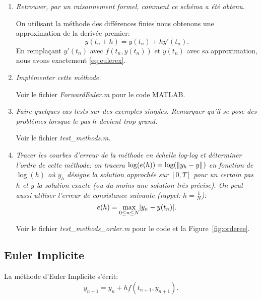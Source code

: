 \documentclass[a4paper,10pt]{article}
\begin{document}
\begin{enumerate}
    \item \emph{Retrouver, par un raisonnement formel, comment ce schéma a été
    obtenu.}

    On utilisant la méthode des différences finies nous obtenons une approximation de
    la derivée premier:
\[
    y(t_n + h) = y(t_n) + hy'(t_n).
\]
    En remplaçant $y'(t_n)$ avec $f(t_n, y(t_n))$ et $y(t_n)$ avec sa approximation,
    nous avons exactement \eqref{eq:eulerex}.

    \item \emph{Implémenter cette méthode.}

    Voir le fichier \emph{ForwardEuler.m} pour le code MATLAB.

    \item \emph{Faire quelques cas tests sur des exemples simples. Remarquer qu'il se
    pose des problèmes lorsque le pas $h$ devient trop grand.}

    Voir le fichier \emph{test\_methods.m}.
    \item \emph{Tracer les courbes d’erreur de la méthode en échelle log-log et
    déterminer l'ordre de cette méthode: on tracera $\log(e(h)) = \log(\lVert y_h -
    y\rVert_{})$ en fonction de $\log(h)$ où $y_h$ désigne la solution approchée sur
    $[0, T]$ pour un certain pas $h$ et $y$ la solution exacte (ou du moins une
    solution très précise). On peut aussi utiliser l'erreur de consistance
    suivante (rappel: $h = \frac{1}{N}$):}
\[
    e(h) = \max_{0 \leq n \leq N} \lvert y_n - y(t_n)\rvert_{}.
\]

    Voir le fichier \emph{test\_methods\_order.m} pour le code et la
    Figure~\ref{fig:orderee}.
\end{enumerate}

\subsection{Euler Implicite}
La méthode d’Euler Implicite s’écrit:
\begin{equation}\label{eq:eulerim}
    y_{n + 1} = y_n + h f(t_{n + 1}, y_{n + 1}).
\end{equation}
\end{document}
